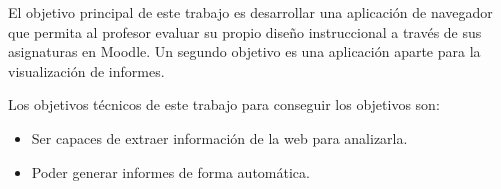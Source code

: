 
El objetivo principal de este trabajo es desarrollar una aplicación de navegador
que permita al profesor evaluar su propio diseño instruccional a través de sus asignaturas en Moodle.
Un segundo objetivo es una aplicación aparte para la visualización de informes.

Los objetivos técnicos de este trabajo para conseguir los objetivos son:
\begin{itemize}
	\item Ser capaces de extraer información de la web para analizarla.
	\item Poder generar informes de forma automática.
\end{itemize}
